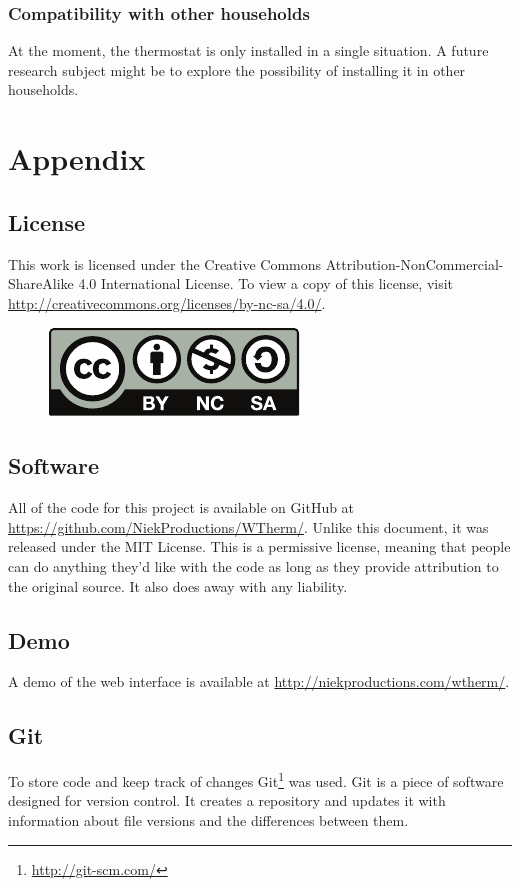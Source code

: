 \documentclass[12pt,a4paper,final]{report}
\begin{document}
\section{Compatibility with other households}
At the moment, the thermostat is only installed in a single situation. A future research subject might be to explore the possibility of installing it in other households.
\newpage
\printbibliography
\vfill

\part*{Appendix}
{}
\chapter{License} \label{chap:License}
This work is licensed under the Creative Commons Attribution-NonCommercial-ShareAlike 4.0 International License. To view a copy of this license, visit \url{http://creativecommons.org/licenses/by-nc-sa/4.0/}.
\begin{figure}[H]
  \begin{center}
      \includegraphics{by-nc-sa}
  \end{center}
\end{figure}

\chapter{Software} \label{chap:Software}
All of the code for this project is available on GitHub at \url{https://github.com/NiekProductions/WTherm/}. Unlike this document, it was released under the MIT License. This is a permissive license, meaning that people can do anything they'd like with the code as long as they provide attribution to the original source. It also does away with any liability.

\chapter{Demo}
A demo of the web interface is available at \url{http://niekproductions.com/wtherm/}.

\chapter{Git}
To store code and keep track of changes Git\footnote{\url{http://git-scm.com/}} was used. Git is a piece of software designed for version control. It creates a repository and updates it with information about file versions and the differences between them.
\end{document}
